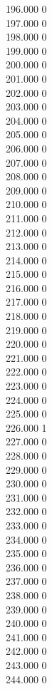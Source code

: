 { 196.000	0 \\
 197.000	0 \\
 198.000	0 \\
 199.000	0 \\
 200.000	0 \\
 201.000	0 \\
 202.000	0 \\
 203.000	0 \\
 204.000	0 \\
 205.000	0 \\
 206.000	0 \\
 207.000	0 \\
 208.000	0 \\
 209.000	0 \\
 210.000	0 \\
 211.000	0 \\
 212.000	0 \\
 213.000	0 \\
 214.000	0 \\
 215.000	0 \\
 216.000	0 \\
 217.000	0 \\
 218.000	0 \\
 219.000	0 \\
 220.000	0 \\
 221.000	0 \\
 222.000	0 \\
 223.000	0 \\
 224.000	0 \\
 225.000	0 \\
 226.000	1 \\
 227.000	0 \\
 228.000	0 \\
 229.000	0 \\
 230.000	0 \\
 231.000	0 \\
 232.000	0 \\
 233.000	0 \\
 234.000	0 \\
 235.000	0 \\
 236.000	0 \\
 237.000	0 \\
 238.000	0 \\
 239.000	0 \\
 240.000	0 \\
 241.000	0 \\
 242.000	0 \\
 243.000	0 \\
 244.000	0 \\
}
